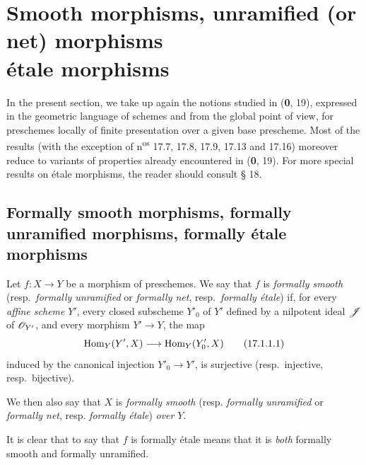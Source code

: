 \section[Smooth morphisms, unramified (or net) morphisms étale morphisms]{Smooth morphisms, unramified (or net) morphisms\\étale morphisms}
\label{section:IV.17}

In the present section, we take up again the notions studied in (\textbf{0}, 19), expressed in the geometric language of schemes and from the global point of view, for preschemes locally of finite presentation over a given base prescheme. Most of the results (with the exception of n\textsuperscript{os} 17.7, 17.8, 17.9, 17.13 and 17.16) moreover reduce to variants of properties already encountered in (\textbf{0}, 19). For more special results on étale morphisms, the reader should consult § 18.

\subsection{Formally smooth morphisms, formally unramified morphisms, formally étale morphisms}

\begin{definition}[17.1.1]\label{IV.17.1.1}
Let $f:X\to Y$ be a morphism of preschemes. We say that $f$ is \emph{formally smooth} \textup{(resp.}\ \emph{formally unramified} or \emph{formally net}, \textup{resp.}\ \emph{formally étale}\textup{)} if, for every \emph{affine scheme} $Y'$, every closed subscheme $Y'_0$ of $Y'$ defined by a nilpotent ideal $\mathscr{J}$ of $\mathscr{O}_{Y'}$, and every morphism $Y'\to Y$, the map
\[
\label{IV.17.1.1.1}
  \operatorname{Hom}_Y(Y',X)\longrightarrow\operatorname{Hom}_Y(Y'_0,X)
  \tag{17.1.1.1}
\]
induced by the canonical injection $Y'_0\to Y'$, is surjective \textup{(resp.}\ injective, \textup{resp.}\ bijective\textup{)}.
\end{definition}

We then also say that $X$ is \emph{formally smooth} (resp. \emph{formally unramified} or \emph{formally net}, resp. \emph{formally étale}) \emph{over} $Y$.

It is clear that to say that $f$ is formally étale means that it is \emph{both} formally smooth and formally unramified.

